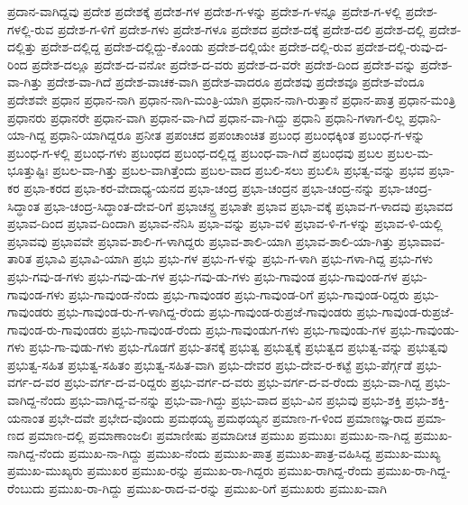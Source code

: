 ಪ್ರದಾನ-ವಾಗಿದ್ದವು
ಪ್ರದೇಶ
ಪ್ರದೇಶಕ್ಕೆ
ಪ್ರದೇಶ-ಗಳ
ಪ್ರದೇಶ-ಗ-ಳನ್ನು
ಪ್ರದೇಶ-ಗ-ಳನ್ನೂ
ಪ್ರದೇಶ-ಗ-ಳಲ್ಲಿ
ಪ್ರದೇಶ-ಗಳಲ್ಲಿ-ರುವ
ಪ್ರದೇಶ-ಗ-ಳಿಗೆ
ಪ್ರದೇಶ-ಗಳು
ಪ್ರದೇಶ-ಗಳೂ
ಪ್ರದೇಶದ
ಪ್ರದೇಶ-ದಕ್ಕೆ
ಪ್ರದೇಶ-ದಲಿ
ಪ್ರದೇಶ-ದಲ್ಲಿ
ಪ್ರದೇಶ-ದಲ್ಲಿತ್ತು
ಪ್ರದೇಶ-ದಲ್ಲಿದ್ದ
ಪ್ರದೇಶ-ದಲ್ಲಿದ್ದು-ಕೊಂಡು
ಪ್ರದೇಶ-ದಲ್ಲಿಯೇ
ಪ್ರದೇಶ-ದಲ್ಲಿ-ರುವ
ಪ್ರದೇಶ-ದಲ್ಲಿ-ರುವು-ದ-ರಿಂದ
ಪ್ರದೇಶ-ದಲ್ಲೂ
ಪ್ರದೇಶ-ದ-ವನೋ
ಪ್ರದೇಶ-ದ-ವರು
ಪ್ರದೇಶ-ದ-ವರೇ
ಪ್ರದೇಶ-ದಿಂದ
ಪ್ರದೇಶ-ವನ್ನು
ಪ್ರದೇಶ-ವಾ-ಗಿತ್ತು
ಪ್ರದೇಶ-ವಾ-ಗಿದೆ
ಪ್ರದೇಶ-ವಾಚಕ-ವಾಗಿ
ಪ್ರದೇಶ-ವಾದರೂ
ಪ್ರದೇಶವು
ಪ್ರದೇಶವೂ
ಪ್ರದೇಶ-ವೆಂದೂ
ಪ್ರದೇಶವೇ
ಪ್ರಧಾನ
ಪ್ರಧಾನ-ನಾಗಿ
ಪ್ರಧಾನ-ನಾಗಿ-ಮಂತ್ರಿ-ಯಾಗಿ
ಪ್ರಧಾನ-ನಾಗಿ-ರುತ್ತಾನೆ
ಪ್ರಧಾನ-ಪಾತ್ರ
ಪ್ರಧಾನ-ಮಂತ್ರಿ
ಪ್ರಧಾನರು
ಪ್ರಧಾನರೇ
ಪ್ರಧಾನ-ವಾಗಿ
ಪ್ರಧಾನ-ವಾ-ಗಿದೆ
ಪ್ರಧಾನ-ವಾ-ಗಿದ್ದು
ಪ್ರಧಾನಿ
ಪ್ರಧಾನಿ-ಗಳಾಗ-ಲಿಲ್ಲ
ಪ್ರಧಾನಿ-ಯಾ-ಗಿದ್ದ
ಪ್ರಧಾನಿ-ಯಾಗಿದ್ದರೂ
ಪ್ರನೀತ
ಪ್ರಪಂಚದ
ಪ್ರಪಂಚಾಂಚಿತ
ಪ್ರಬಂಧ
ಪ್ರಬಂಧಕ್ಕಿಂತ
ಪ್ರಬಂಧ-ಗ-ಳನ್ನು
ಪ್ರಬಂಧ-ಗ-ಳಲ್ಲಿ
ಪ್ರಬಂಧ-ಗಳು
ಪ್ರಬಂಧದ
ಪ್ರಬಂಧ-ದಲ್ಲಿದ್ದ
ಪ್ರಬಂಧ-ವಾ-ಗಿದೆ
ಪ್ರಬಂಧವು
ಪ್ರಬಲ
ಪ್ರಬಲ-ಮ-ಭೂತ್ತುಷ್ಟಿಃ
ಪ್ರಬಲ-ವಾ-ಗಿತ್ತು
ಪ್ರಬಲ-ವಾಗಿತ್ತೆಂದು
ಪ್ರಬಲ-ವಾದ
ಪ್ರಬಲಿ-ಸಲು
ಪ್ರಬಲಿಸಿ
ಪ್ರಭತ್ವ-ವನ್ನು
ಪ್ರಭವ
ಪ್ರಭಾ-ಕರ
ಪ್ರಭಾ-ಕರದ
ಪ್ರಭಾ-ಕರ-ವೇದಾಧ್ಯ-ಯನದ
ಪ್ರಭಾ-ಚಂದ್ರ
ಪ್ರಭಾ-ಚಂದ್ರನ
ಪ್ರಭಾ-ಚಂದ್ರ-ನನ್ನು
ಪ್ರಭಾ-ಚಂದ್ರ-ಸಿದ್ಧಾಂತ
ಪ್ರಭಾ-ಚಂದ್ರ-ಸಿದ್ಧಾಂತ-ದೇವ-ರಿಗೆ
ಪ್ರಭಾಚನ್ದ್ರ
ಪ್ರಭಾತೇ
ಪ್ರಭಾವ
ಪ್ರಭಾ-ವಕ್ಕೆ
ಪ್ರಭಾವ-ಗ-ಳಾದವು
ಪ್ರಭಾವದ
ಪ್ರಭಾವ-ದಿಂದ
ಪ್ರಭಾವ-ದಿಂದಾಗಿ
ಪ್ರಭಾವ-ನೆನಿಸಿ
ಪ್ರಭಾ-ವನ್ನು
ಪ್ರಭಾ-ವಳಿ
ಪ್ರಭಾವ-ಳಿ-ಗ-ಳನ್ನು
ಪ್ರಭಾವ-ಳಿ-ಯಲ್ಲಿ
ಪ್ರಭಾವವು
ಪ್ರಭಾವವೇ
ಪ್ರಭಾವ-ಶಾಲಿ-ಗ-ಳಾಗಿದ್ದರು
ಪ್ರಭಾವ-ಶಾಲಿ-ಯಾಗಿ
ಪ್ರಭಾವ-ಶಾಲಿ-ಯಾ-ಗಿತ್ತು
ಪ್ರಭಾವಾವ-ತಾರಿತ
ಪ್ರಭಾವಿ
ಪ್ರಭಾವಿ-ಯಾಗಿ
ಪ್ರಭು
ಪ್ರಭು-ಗಳ
ಪ್ರಭು-ಗ-ಳನ್ನು
ಪ್ರಭು-ಗ-ಳಾಗಿ
ಪ್ರಭು-ಗಳಾ-ಗಿದ್ದ
ಪ್ರಭು-ಗಳು
ಪ್ರಭು-ಗವು-ಡ-ಗಳು
ಪ್ರಭು-ಗವು-ಡು-ಗಳ
ಪ್ರಭು-ಗವು-ಡು-ಗಳು
ಪ್ರಭು-ಗಾವುಂಡ
ಪ್ರಭು-ಗಾವುಂಡ-ಗಳ
ಪ್ರಭು-ಗಾವುಂಡ-ಗಳು
ಪ್ರಭು-ಗಾವುಂಡ-ನೆಂದು
ಪ್ರಭು-ಗಾವುಂಡರ
ಪ್ರಭು-ಗಾವುಂಡ-ರಿಗೆ
ಪ್ರಭು-ಗಾವುಂಡ-ರಿದ್ದರು
ಪ್ರಭು-ಗಾವುಂಡರು
ಪ್ರಭು-ಗಾವುಂಡ-ರು-ಗ-ಳಾಗಿದ್ದ-ರೆಂದು
ಪ್ರಭು-ಗಾವುಂಡ-ರುಪ್ರಜೆ-ಗಾವುಂಡರು
ಪ್ರಭು-ಗಾವುಂಡ-ರುಪ್ರಜೆ-ಗಾವುಂಡ-ರು-ಗಾವುಂಡರು
ಪ್ರಭು-ಗಾವುಂಡ-ರೆಂದು
ಪ್ರಭು-ಗಾವುಂಡುಗ-ಗಳು
ಪ್ರಭು-ಗಾವುಂಡು-ಗಳ
ಪ್ರಭು-ಗಾವುಂಡು-ಗಳು
ಪ್ರಭು-ಗಾ-ವುಡು-ಗಳು
ಪ್ರಭು-ಗೊಡಗೆ
ಪ್ರಭು-ತನಕ್ಕೆ
ಪ್ರಭುತ್ವ
ಪ್ರಭುತ್ವಕ್ಕೆ
ಪ್ರಭುತ್ವದ
ಪ್ರಭುತ್ವ-ವನ್ನು
ಪ್ರಭುತ್ವವು
ಪ್ರಭುತ್ವ-ಸಹಿತ
ಪ್ರಭುತ್ವ-ಸಹಿತಂ
ಪ್ರಭುತ್ವ-ಸಹಿತ-ವಾಗಿ
ಪ್ರಭು-ದೇವರ
ಪ್ರಭು-ದೇವ-ರ-ಕಟ್ಟೆ
ಪ್ರಭು-ಪೆರ್ಗ್ಗಡೆ
ಪ್ರಭು-ವರ್ಗ-ದ-ವರ
ಪ್ರಭು-ವರ್ಗ-ದ-ವ-ರಿದ್ದರು
ಪ್ರಭು-ವರ್ಗ-ದ-ವರು
ಪ್ರಭು-ವರ್ಗ-ದ-ವ-ರೆಂದು
ಪ್ರಭು-ವಾ-ಗಿದ್ದ
ಪ್ರಭು-ವಾಗಿದ್ದ-ನೆಂದು
ಪ್ರಭು-ವಾಗಿದ್ದ-ವ-ನನ್ನು
ಪ್ರಭು-ವಾ-ಗಿದ್ದು
ಪ್ರಭು-ವಾದ
ಪ್ರಭು-ವಿನ
ಪ್ರಭುವು
ಪ್ರಭು-ಶಕ್ತಿ
ಪ್ರಭು-ಶಕ್ತಿ-ಯನಾಂತ
ಪ್ರಭೇ-ದವೇ
ಪ್ರಭೇದ-ವೊಂದು
ಪ್ರಮಥಯ್ಯ
ಪ್ರಮಥಯ್ಯನ
ಪ್ರಮಾಣ-ಗ-ಳಿಂದ
ಪ್ರಮಾಣಜ್ಞ-ರಾದ
ಪ್ರಮಾ-ಣದ
ಪ್ರಮಾಣ-ದಲ್ಲಿ
ಪ್ರಮಾಣಾಂಜಲಿಃ
ಪ್ರಮಾಣೀಷು
ಪ್ರಮಾದೀಚ
ಪ್ರಮುಖ
ಪ್ರಮುಖಃ
ಪ್ರಮುಖ-ನಾ-ಗಿದ್ದ
ಪ್ರಮುಖ-ನಾಗಿದ್ದ-ನೆಂದು
ಪ್ರಮುಖ-ನಾ-ಗಿದ್ದು
ಪ್ರಮುಖ-ನೆಂದು
ಪ್ರಮುಖ-ಪಾತ್ರ
ಪ್ರಮುಖ-ಪಾತ್ರ-ವಹಿಸಿದ್ದ
ಪ್ರಮುಖ-ಮುಖ್ಯ
ಪ್ರಮುಖ-ಮುಖ್ಯರು
ಪ್ರಮುಖರ
ಪ್ರಮುಖ-ರನ್ನು
ಪ್ರಮುಖ-ರಾ-ಗಿದ್ದರು
ಪ್ರಮುಖ-ರಾಗಿದ್ದ-ರೆಂದು
ಪ್ರಮುಖ-ರಾ-ಗಿದ್ದ-ರೆಂಬುದು
ಪ್ರಮುಖ-ರಾ-ಗಿದ್ದು
ಪ್ರಮುಖ-ರಾದ-ವ-ರನ್ನು
ಪ್ರಮುಖ-ರಿಗೆ
ಪ್ರಮುಖರು
ಪ್ರಮುಖ-ವಾಗಿ

